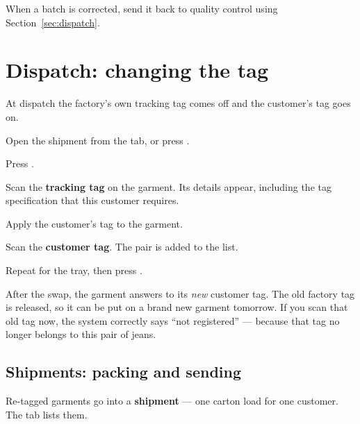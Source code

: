 When a batch is corrected, send it back to quality control using
Section~\ref{sec:dispatch}.

\section{Dispatch: changing the tag}

At dispatch the factory's own tracking tag comes off and the customer's tag goes
on.


\begin{steps}
  \item Open the shipment from the  tab, or press
        .
  \item Press .
  \item Scan the \textbf{tracking tag} on the garment. Its details appear,
        including the tag specification that this customer requires.
  \item Apply the customer's tag to the garment.
  \item Scan the \textbf{customer tag}. The pair is added to the list.
  \item Repeat for the tray, then press .
\end{steps}


\begin{plainwords}
After the swap, the garment answers to its \emph{new} customer tag. The old
factory tag is released, so it can be put on a brand new garment tomorrow. If you
scan that old tag now, the system correctly says ``not registered'' --- because
that tag no longer belongs to this pair of jeans.
\end{plainwords}

\subsection{Shipments: packing and sending}

Re-tagged garments go into a \textbf{shipment} --- one carton load for one
customer. The  tab lists them.


